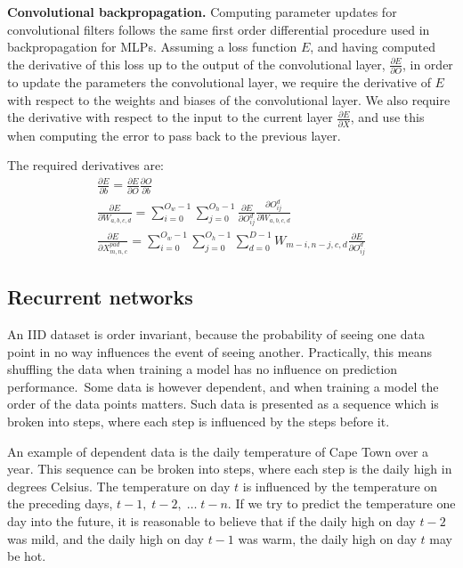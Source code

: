 \noindent \textbf{Convolutional backpropagation.} Computing parameter updates for convolutional filters follows the same first order differential procedure used in backpropagation for MLPs. Assuming a loss function $ E $, and having computed the derivative of this loss up to the output of the convolutional layer, $ \frac{\partial E} {\partial O} $, in order to update the parameters the convolutional layer, we require the derivative of $ E $ with respect to the weights and biases of the convolutional layer. We also require the derivative with respect to the input to the current layer $\frac{\partial E} {\partial X}$, and use this when computing the error to pass back to the previous layer. \par

\noindent The required derivatives are:
\begin{subequations}
	\begin{gather}
		\frac{\partial E} {\partial b} = \frac{\partial E} {\partial O}\frac{\partial O} {\partial b} \\
		\frac{\partial E} {\partial W_{a,b,c,d}} = \sum_{i=0}^{O_w - 1}\sum_{j=0}^{O_h - 1}\frac{\partial E} {\partial O_{ij}^{d}}\frac{\partial O_{ij}^d} {\partial W_{a,b,c,d}} \\
		\frac{\partial E} {\partial X_{m,n,c}^{pad}} = \sum_{i=0}^{O_w - 1}\sum_{j=0}^{O_h - 1}\sum_{d=0}^{D - 1}W_{m-i,n-j,c,d}\frac{\partial E} {\partial O_{ij}^{d}}
	\end{gather}
\end{subequations}


\subsection{Recurrent networks}

An IID dataset is order invariant, because the probability of seeing one data point in no way influences the event of seeing another. Practically, this means shuffling the data when training a model has no influence on prediction performance.\ Some data is however dependent, and when training a model the order of the data points matters. Such data is presented as a sequence which is broken into steps, where each step is influenced by the steps before it. \par

\noindent An example of dependent data is the daily temperature of Cape Town over a year. This sequence can be broken into steps, where each step is the daily high in degrees Celsius. The temperature on day $ t $ is influenced by the temperature on the preceding days, $ t - 1, \; t - 2, \; \dots \; t - n $. If we try to predict the temperature one day into the future, it is reasonable to believe that if the daily high on day $ t - 2 $ was mild, and the daily high on day $ t - 1 $ was warm, the daily high on day $ t $ may be hot. \par
 
